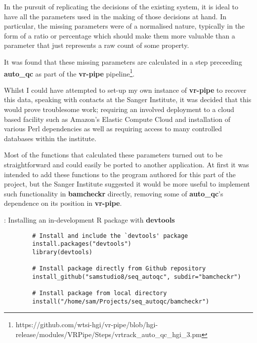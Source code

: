In the pursuit of replicating the decisions of the
existing system, it is ideal to have all the parameters used in the making of
those decisions at hand. In particular, the missing parameters were of a
normalised nature, typically in the form of a ratio or percentage which should
make them more valuable than a parameter that just represents a raw count of
some property.

It was found that these missing parameters are calculated in a step preceeding
\textbf{auto\_qc} as part of the \textbf{vr-pipe}
pipeline\footnote{https://github.com/wtsi-hgi/vr-pipe/blob/hgi-release/modules/VRPipe/Steps/vrtrack\_auto\_qc\_hgi\_3.pm}.


Whilst I could have attempted to set-up my own instance of \textbf{vr-pipe} to
recover this data, speaking with contacts at the Sanger Institute, it was
decided that this would prove troublesome work; requiring an involved
deployment to a cloud based facility such as Amazon's Elastic Compute Cloud and
installation of various Perl dependencies as well as requiring access to many
controlled databases within the institute.

Most of the functions that calculated these parameters turned out to be
straightforward and could easily be ported to another application. At first
it was intended to add these functions to the program authored for this part of
the project, but the Sanger Institute suggested it would be more useful to
implement such functionality in \textbf{bamcheckr} directly, removing some of
\textbf{auto\_qc}'s dependence on its position in \textbf{vr-pipe}.

\begin{listing}[H]
    \caption[r-dev]{: Installing an in-development R package with \textbf{devtools}}
    \label{list:r-dev}
    \begin{verbatim}
        # Install and include the `devtools' package
        install.packages("devtools")
        library(devtools)

        # Install package directly from Github repository
        install_github("samstudio8/seq_autoqc", subdir="bamcheckr")

        # Install package from local directory
        install("/home/sam/Projects/seq_autoqc/bamcheckr")

    \end{verbatim}
\end{listing}

